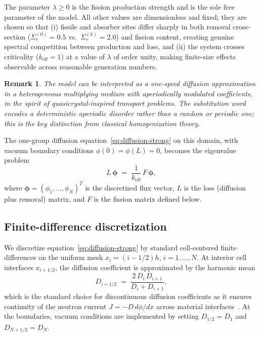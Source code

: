 \documentclass[11pt]{article}
\newtheorem{remark}[theorem]{Remark}
\newcommand{\keff}{k_{\mathrm{eff}}}
\newcommand{\Sigmar}{\Sigma_r}
\begin{document}
The parameter $\lambda \geq 0$ is the fission production strength and
is the sole free parameter of the model.
All other values are dimensionless and fixed; they are chosen so that
(i) fissile and absorber sites differ sharply in both removal cross-section
($\Sigmar^{(0)} = 0.5$ vs.\ $\Sigmar^{(k)} = 2.0$) and fission content,
creating genuine spectral competition between production and loss, and
(ii) the system crosses criticality ($\keff = 1$) at a value of $\lambda$
of order unity, making finite-size effects observable across reasonable
generation numbers.

\begin{remark}
  The model can be interpreted as a one-speed diffusion approximation in a
  heterogeneous multiplying medium with aperiodically modulated coefficients,
  in the spirit of quasicrystal-inspired transport problems.
  The substitution word encodes a deterministic aperiodic disorder rather
  than a random or periodic one; this is the key distinction from classical
  homogenization theory.
\end{remark}

The one-group diffusion equation~\eqref{eq:diffusion-strong} on this
domain, with vacuum boundary conditions $\phi(0) = \phi(L) = 0$,
becomes the eigenvalue problem
\begin{equation}
  L\,\boldsymbol{\phi} \;=\; \frac{1}{\keff}\,F\,\boldsymbol{\phi},
  \label{eq:evp}
\end{equation}
where $\boldsymbol{\phi} = (\phi_1,\ldots,\phi_N)^T$ is the discretized
flux vector, $L$ is the loss (diffusion plus removal) matrix, and $F$ is
the fission matrix defined below.

\subsection{Finite-difference discretization}
\label{sec:fd}

We discretize equation~\eqref{eq:diffusion-strong} by standard
cell-centered finite differences on the uniform mesh $x_i = (i-1/2)h$,
$i = 1,\ldots,N$.
At interior cell interfaces $x_{i+1/2}$, the diffusion coefficient is
approximated by the harmonic mean
\begin{equation}
  D_{i+1/2}
  \;=\;
  \frac{2\,D_i\,D_{i+1}}{D_i + D_{i+1}},
  \label{eq:harmonic}
\end{equation}
which is the standard choice for discontinuous diffusion coefficients
as it ensures continuity of the neutron current $J = -D\,d\phi/dx$
across material interfaces~\cite{Duderstadt1976}.
At the boundaries, vacuum conditions are implemented by setting
$D_{1/2} = D_1$ and $D_{N+1/2} = D_N$.
\end{document}
